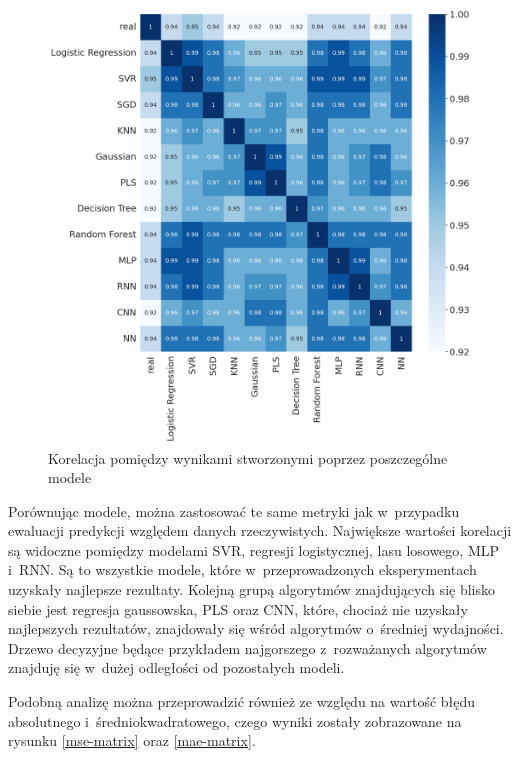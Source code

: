 \begin{figure}[H]
    \centering
    \includegraphics[width=\textwidth]{images/correlation_matrix2.png}
    \caption[Korelacja ze względu na model]{Korelacja pomiędzy wynikami stworzonymi poprzez poszczególne modele}
    \label{pred_corr}
\end{figure}

Porównując modele, można zastosować te same metryki jak w~przypadku ewaluacji predykcji względem 
danych rzeczywistych. Największe wartości korelacji są widoczne pomiędzy modelami SVR, regresji logistycznej,
lasu losowego, MLP i~RNN. Są to wszystkie modele, które w~przeprowadzonych eksperymentach uzyskały najlepsze
rezultaty. Kolejną grupą algorytmów znajdujących się blisko siebie jest regresja gaussowska, PLS oraz CNN,
które, chociaż nie uzyskały najlepszych rezultatów, znajdowały się wśród algorytmów o~średniej wydajności.
Drzewo decyzyjne będące przykładem najgorszego z~rozważanych algorytmów znajduję się w~dużej odległości
od pozostałych modeli.

Podobną analizę można przeprowadzić również ze względu na wartość błędu absolutnego i~średniokwadratowego,
czego wyniki zostały zobrazowane na rysunku \ref{mse-matrix} oraz \ref{mae-matrix}.

